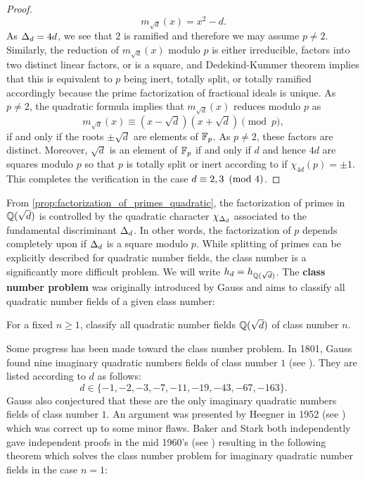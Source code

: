 \begin{proof}
      \[
        m_{\sqrt{d}}(x) = x^{2}-d.
      \]
      As $\Delta_{d} = 4d$, we see that $2$ is ramified and therefore we may assume $p \neq 2$. Similarly, the reduction of $m_{\sqrt{d}}(x)$ modulo $p$ is either irreducible, factors into two distinct linear factors, or is a square, and Dedekind-Kummer theorem implies that this is equivalent to $p$ being inert, totally split, or totally ramified accordingly because the prime factorization of fractional ideals is unique. As $p \neq 2$, the quadratic formula implies that $m_{\sqrt{d}}(x)$ reduces modulo $p$ as
      \[
        m_{\sqrt{d}}(x) \equiv (x-\sqrt{d})(x+\sqrt{d}) \pmod{p},
      \]
      if and only if the roots $\pm\sqrt{d}$ are elements of $\mathbb{F}_{p}$. As $p \neq 2$, these factors are distinct. Moreover, $\sqrt{d}$ is an element of $\mathbb{F}_{p}$ if and only if $d$ and hence $4d$ are squares modulo $p$ so that $p$ is totally split or inert according to if $\chi_{4d}(p) = \pm1$. This completes the verification in the case $d \equiv 2,3 \ \left(\text{mod }4\right)$.
    \end{proof}

    From \cref{prop:factorization_of_primes_quadratic}, the factorization of primes in $\mathbb{Q}(\sqrt{d})$ is controlled by the quadratic character $\chi_{\Delta_{d}}$ associated to the fundamental discriminant $\Delta_{d}$. In other words, the factorization of $p$ depends completely upon if $\Delta_{d}$ is a square modulo $p$. While splitting of primes can be explicitly described for quadratic number fields, the class number is a significantly more difficult problem. We will write $h_{d} = h_{\mathbb{Q}(\sqrt{d})}$. The \textbf{class number problem} was originally introduced by Gauss and aims to classify all quadratic number fields of a given class number:

    \begin{problem*}
      For a fixed $n \ge 1$, classify all quadratic number fields $\mathbb{Q}(\sqrt{d})$ of class number $n$.
    \end{problem*}

    Some progress has been made toward the class number problem. In 1801, Gauss found nine imaginary quadratic numbers fields of class number $1$ (see \cite{gauss1801disquisitiones}). They are listed according to $d$ as follows:
    \[
      d  \in \{-1,-2,-3,-7,-11,-19,-43,-67,-163\}.
    \]
    Gauss also conjectured that these are the only imaginary quadratic numbers fields of class number $1$. An argument was presented by Heegner in 1952 (see \cite{heegner1952diophantische}) which was correct up to some minor flaws. Baker and Stark both independently gave independent proofs in the mid 1960's (see \cite{baker1967linear,stark1967complete}) resulting in the following theorem which solves the class number problem for imaginary quadratic number fields in the case $n = 1$:

